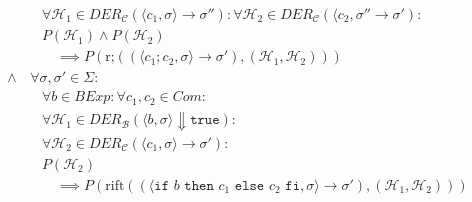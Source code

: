 \begin{align*}
						                  & \quad \forall \mathcal{H} _ 1 \in \textit{DER} _ \mathcal{C} (\langle c _ 1, \sigma \rangle \rightarrow \sigma'') : \forall \mathcal{H} _ 2 \in \textit{DER} _ \mathcal{C} (\langle c _ 2, \sigma'' \rightarrow \sigma') : \tag{Herleitungen in Prämisse} \\
						                  & \quad P(\mathcal{H} _ 1) \land P(\mathcal{H} _ 2) \tag{Prämisse}                                                                                                                                                                                          \\
						                  & \quad\quad \implies P(\text{r;}((\langle c _ 1 ; c _ 2, \sigma \rangle \rightarrow \sigma'), (\mathcal{H} _ 1, \mathcal{H} _ 2))) \tag{Konklusion}                                                                                                        \\
						\land             & \,\forall \sigma, \sigma' \in \Sigma : \tag{Zustände}                                                                                                                                                                                                     \\
						                  & \quad \forall b \in \textit{BExp} : \forall c _ 1, c _ 2 \in \textit{Com} : \tag{Ausdrucksbestandteile}                                                                                                                                                   \\
						                  & \quad \forall \mathcal{H} _ 1 \in \textit{DER} _ \mathcal{B} (\langle b, \sigma \rangle \Downarrow \texttt{true}) : \tag{Kalkülfremde Herleitungen}                                                                                                       \\
						                  & \quad \forall \mathcal{H} _ 2 \in \textit{DER} _ \mathcal{C} (\langle c _ 1, \sigma \rangle \rightarrow \sigma') : \tag{Herleitungen in Prämisse}                                                                                                         \\
						                  & \quad P(\mathcal{H} _ 2) \tag{Prämisse}                                                                                                                                                                                                                   \\
						                  & \quad\quad \implies P(\text{rift}((\langle \texttt{if } b \texttt{ then } c _ 1 \texttt{ else } c _ 2 \texttt{ fi}, \sigma \rangle \rightarrow \sigma'), (\mathcal{H} _ 1, \mathcal{H} _ 2))) \tag{Konklusion}                                            \\

\end{align*}
